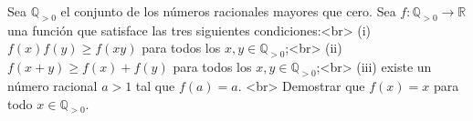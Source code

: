 Sea $\mathbb{Q}_{>0}$ el conjunto de los números racionales mayores que cero. Sea $f : \mathbb{Q}_{\gt 0} \to \mathbb{R}$ una función que satisface las tres siguientes condiciones:<br>
(i) $f(x)f(y) \geq f(xy)$ para todos los $x,y \in \mathbb{Q}_{>0}$;<br>
(ii) $f(x+y)\geq f(x)+f(y)$ para todos los $x,y \in \mathbb{Q}_{>0}$;<br>
(iii) existe un número racional $a > 1$ tal que $f(a) = a$. <br>
Demostrar que $f(x) = x$ para todo $x \in \mathbb{Q}_{>0}$.